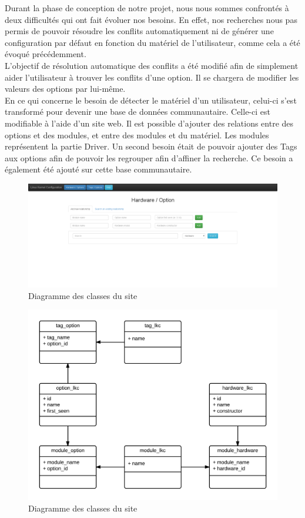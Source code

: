 \documentclass[16pts]{report}
\begin{document}
Durant la phase de conception de notre projet, nous nous sommes confrontés à 
deux difficultés qui ont fait évoluer nos besoins. En effet, nos recherches 
nous pas permis de pouvoir résoudre les conflits automatiquement ni de générer 
une configuration par défaut en fonction du matériel de l'utilisateur, comme
cela a été évoqué précédemment. 
\\
L'objectif de résolution automatique des conflits a été modifié afin de 
simplement aider l'utilisateur à trouver les conflits d'une option. Il se 
chargera de modifier les valeurs des options par lui-même.
\\
En ce qui concerne le besoin de détecter le matériel d'un utilisateur, celui-ci 
s'est transformé pour devenir une base de données communautaire. Celle-ci est 
modifiable à l'aide d'un site web. Il est possible d'ajouter des relations 
entre des options et des modules, et entre des modules et du matériel. Les 
modules représentent la partie Driver. Un second besoin était de pouvoir 
ajouter des Tags aux options afin de pouvoir les regrouper afin d'affiner la 
recherche. Ce besoin a également été ajouté sur cette base communautaire.

\begin{figure}[H]
	\includegraphics[scale=0.3]{./illustrations/screen_site_hardware.png}
	\centering
	\caption{Diagramme des classes du site}
	\label{fig:DiagSite}
\end{figure}

\begin{figure}[H]
	\includegraphics[scale=0.2]{./illustrations/diagramme_classes_site.png}
	\centering
	\caption{Diagramme des classes du site}
	\label{fig:DiagSite}
\end{figure}
\end{document}
